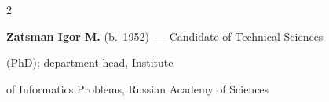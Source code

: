 \begin{multicols}{2}
\vspace*{10pt}



\noindent

\textbf{Zatsman Igor M.} (b.\ 1952)~--- Candidate of Technical Sciences

(PhD); department head, Institute

of Informatics Problems, Russian Academy of Sciences











\end{multicols}

